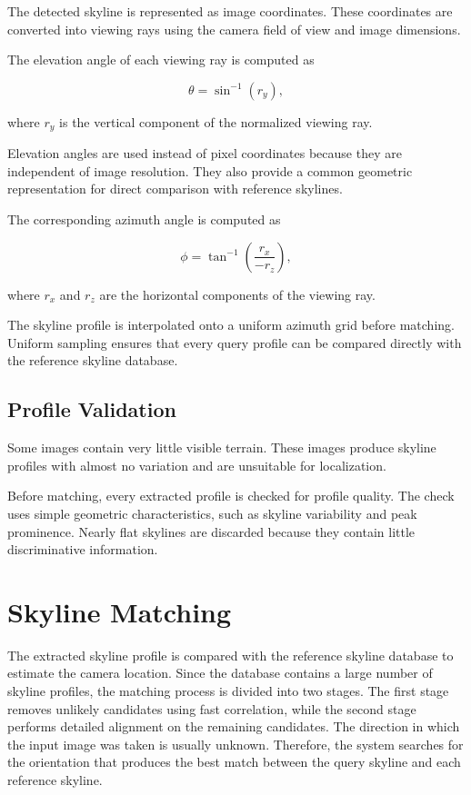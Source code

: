 The detected skyline is represented as image coordinates. These coordinates are converted into viewing rays using the camera field of view and image dimensions.

The elevation angle of each viewing ray is computed as

\begin{equation}
\theta=\sin^{-1}(r_y),
\label{eq:elevation}
\end{equation}

where $r_y$ is the vertical component of the normalized viewing ray.

Elevation angles are used instead of pixel coordinates because they are independent of image resolution. They also provide a common geometric representation for direct comparison with reference skylines.

The corresponding azimuth angle is computed as

\begin{equation}
\phi=\tan^{-1}\left(\frac{r_x}{-r_z}\right),
\label{eq:azimuth}
\end{equation}

where $r_x$ and $r_z$ are the horizontal components of the viewing ray.

The skyline profile is interpolated onto a uniform azimuth grid before matching. Uniform sampling ensures that every query profile can be compared directly with the reference skyline database.

\subsection{Profile Validation}

Some images contain very little visible terrain. These images produce skyline profiles with almost no variation and are unsuitable for localization.

Before matching, every extracted profile is checked for profile quality. The check uses simple geometric characteristics, such as skyline variability and peak prominence. Nearly flat skylines are discarded because they contain little discriminative information.

\section{Skyline Matching}

The extracted skyline profile is compared with the reference skyline database to estimate the camera location. Since the database contains a large number of skyline profiles, the matching process is divided into two stages. The first stage removes unlikely candidates using fast correlation, while the second stage performs detailed alignment on the remaining candidates. The direction in which the input image was taken is usually unknown. Therefore, the system searches for the orientation that produces the best match between the query skyline and each reference skyline.

